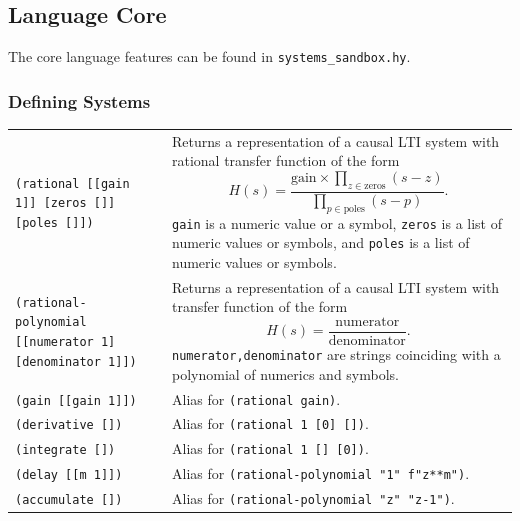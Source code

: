 \documentclass[11pt,letter]{article}
\begin{document}
\subsection{Language Core}

The core language features can be found in \lstinline!systems_sandbox.hy!.

\subsubsection{Defining Systems}

\begin{longtable}{ p{} p{} }
  \texttt{(rational [[gain 1]] [zeros []] [poles []])}
  &
  Returns a representation of a causal LTI system with rational transfer function of the form
  \begin{equation*}
    H(s) = \frac{\mathrm{gain}\times\prod_{z\in\mathrm{zeros}}(s-z)}{\prod_{p\in\mathrm{poles}}(s-p)}.
  \end{equation*}
  \texttt{gain} is a numeric value or a symbol, \texttt{zeros} is a list of numeric values or symbols, and \texttt{poles} is a list of numeric values or symbols.
  \\

  \texttt{(rational-polynomial [[numerator 1] [denominator 1]])}
  &
  Returns a representation of a causal LTI system with transfer function of the form
  \begin{equation*}
    H(s) = \frac{\mathrm{numerator}}{\mathrm{denominator}}.
  \end{equation*}
  \texttt{numerator,denominator} are strings coinciding with a polynomial of numerics and symbols.
  \\

  \texttt{(gain [[gain 1]])}
  &
  Alias for \texttt{(rational gain)}. \\

  \texttt{(derivative [])}
  &
  Alias for \texttt{(rational 1 [0] [])}. \\

  \texttt{(integrate [])}
  &
  Alias for \texttt{(rational 1 [] [0])}. \\

  \texttt{(delay [[m 1]])}
  &
  Alias for \texttt{(rational-polynomial "1" f"z**{m}")}. \\

  \texttt{(accumulate [])}
  &
  Alias for \texttt{(rational-polynomial "z" "z-1")}. \\


\end{longtable}
\end{document}
